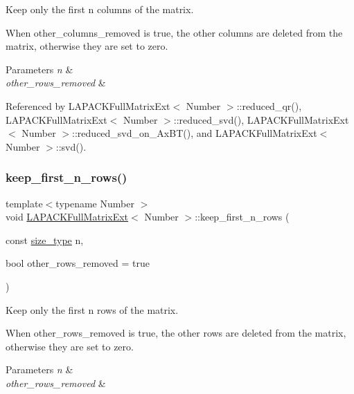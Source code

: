 Keep only the first n columns of the matrix.

When {\ttfamily other\+\_\+columns\+\_\+removed} is true, the other columns are deleted from the matrix, otherwise they are set to zero.


\begin{DoxyParams}{Parameters}
{\em n} & \\
\hline
{\em other\+\_\+rows\+\_\+removed} & \\
\hline
\end{DoxyParams}


Referenced by L\+A\+P\+A\+C\+K\+Full\+Matrix\+Ext$<$ Number $>$\+::reduced\+\_\+qr(), L\+A\+P\+A\+C\+K\+Full\+Matrix\+Ext$<$ Number $>$\+::reduced\+\_\+svd(), L\+A\+P\+A\+C\+K\+Full\+Matrix\+Ext$<$ Number $>$\+::reduced\+\_\+svd\+\_\+on\+\_\+\+Ax\+B\+T(), and L\+A\+P\+A\+C\+K\+Full\+Matrix\+Ext$<$ Number $>$\+::svd().

\mbox{\label{classLAPACKFullMatrixExt_a6cb733ec47cbcb9fed535362616d7e07}} 
\subsubsection{\texorpdfstring{keep\+\_\+first\+\_\+n\+\_\+rows()}{keep\_first\_n\_rows()}}
{\footnotesize\ttfamily template$<$typename Number $>$ \\
void \hyperlink{classLAPACKFullMatrixExt}{L\+A\+P\+A\+C\+K\+Full\+Matrix\+Ext}$<$ Number $>$\+::keep\+\_\+first\+\_\+n\+\_\+rows (\begin{DoxyParamCaption}\item[{const \hyperlink{classLAPACKFullMatrixExt_a5cf5f4a6104dc17029210b5ca52bf574}{size\+\_\+type}}]{n,  }\item[{bool}]{other\+\_\+rows\+\_\+removed = {\ttfamily true} }\end{DoxyParamCaption})}

Keep only the first n rows of the matrix.

When {\ttfamily other\+\_\+rows\+\_\+removed} is true, the other rows are deleted from the matrix, otherwise they are set to zero.


\begin{DoxyParams}{Parameters}
{\em n} & \\
\hline
{\em other\+\_\+rows\+\_\+removed} & \\
\hline
\end{DoxyParams}


